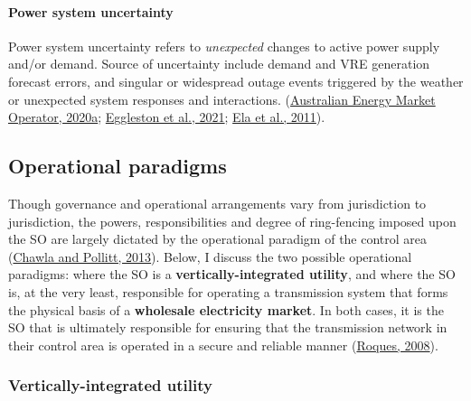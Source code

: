 \documentclass[12pt,a4paper,]{report}
\begin{document}
\hypertarget{power-system-uncertainty}{%
\paragraph{Power system uncertainty}\label{power-system-uncertainty}}

Power system uncertainty refers to \emph{unexpected} changes to active
power supply and/or demand. Source of uncertainty include demand and VRE
generation forecast errors, and singular or widespread outage events
triggered by the weather or unexpected system responses and
interactions.
(\protect\hyperlink{ref-australianenergymarketoperatorRenewableIntegrationStudy2020}{Australian
Energy Market Operator, 2020a};
\protect\hyperlink{ref-egglestonSecurityResilienceTechnical2021}{Eggleston
et al., 2021};
\protect\hyperlink{ref-elaOperatingReservesVariable2011}{Ela et al.,
2011}).

\hypertarget{sec:lit_review-operational_paradigms}{%
\subsection{Operational
paradigms}\label{sec:lit_review-operational_paradigms}}

Though governance and operational arrangements vary from jurisdiction to
jurisdiction, the powers, responsibilities and degree of ring-fencing
imposed upon the SO are largely dictated by the operational paradigm of
the control area
(\protect\hyperlink{ref-chawlaGlobalTrendsElectricity2013}{Chawla and
Pollitt, 2013}). Below, I discuss the two possible operational
paradigms: where the SO is a \textbf{vertically-integrated utility}, and
where the SO is, at the very least, responsible for operating a
transmission system that forms the physical basis of a \textbf{wholesale
electricity market}. In both cases, it is the SO that is ultimately
responsible for ensuring that the transmission network in their control
area is operated in a secure and reliable manner
(\protect\hyperlink{ref-roquesMarketDesignGeneration2008}{Roques,
2008}).

\hypertarget{vertically-integrated-utility}{%
\subsubsection{Vertically-integrated
utility}\label{vertically-integrated-utility}}
\end{document}
